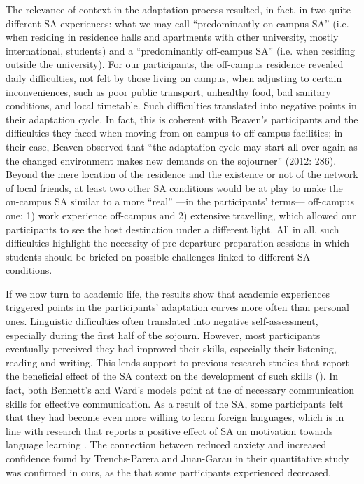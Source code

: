 \documentclass[output=paper]{langsci/langscibook}
\begin{document}
The relevance of context in the adaptation process resulted, in fact, in two quite different SA experiences: what we may call “predominantly on-campus SA” (i.e. when residing in residence halls and apartments with other university, mostly international, students) and a “predominantly off-campus SA” (i.e. when residing outside the university). For our participants, the off-campus residence revealed daily difficulties, not felt by those living on campus, when adjusting to certain inconveniences, such as poor public transport, unhealthy food, bad sanitary conditions, and local timetable. Such difficulties translated into negative  points in their adaptation cycle. In fact, this is coherent with Beaven’s participants and the difficulties they faced when moving from on-campus to off-campus facilities; in their case, Beaven observed that “the adaptation cycle may start all over again as the changed environment makes new demands on the sojourner” (2012: 286).   Beyond the mere location of the residence and the existence or not of the network of local friends, at least two other SA conditions would be at play to make the on-campus SA similar to a more “real” —in the participants’ terms— off-campus one: 1) work experience off-campus and 2) extensive travelling, which allowed our participants to see the host destination under a different light. All in all, such difficulties highlight the necessity of pre-departure preparation sessions in which students should be briefed on possible challenges linked to different SA conditions.

If we now turn to academic life, the results show that academic experiences triggered  points in the participants’ adaptation curves more often than personal ones. Linguistic difficulties often translated into negative self-assess\-ment, especially during the first half of the sojourn. However, most participants eventually perceived they had improved their  skills, especially their listening, reading and writing. This lends support to previous research studies that report the beneficial effect of the SA context on the development of such skills (\citealt{Pérez-Vidal2014}). In fact, both Bennett’s and Ward’s models point at the  of necessary communication skills for effective  communication. As a result of the SA, some participants felt that they had become even more willing to learn foreign languages, which is in line with research that reports a positive effect of SA on motivation towards language learning \citep{Trenchs-PareraJuan-Garau2014}. The connection between reduced anxiety and increased  confidence found by Trenchs-Parera and Juan-Garau in their quantitative study was confirmed in ours, as the  that some participants experienced decreased. 
\end{document}
